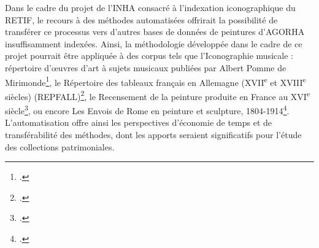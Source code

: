 Dans le cadre du projet de l’INHA consacré à l’indexation iconographique du RETIF, le recours à des méthodes automatisées offrirait la possibilité de transférer ce processus vers d’autres bases de données de peintures d’AGORHA insuffisamment indexées. Ainsi, la méthodologie développée dans le cadre de ce projet pourrait être appliquée à des corpus tels que l’Iconographie musicale : répertoire d'œuvres d'art à sujets musicaux publiées par Albert Pomme de Mirimonde\footcite{institutnationaldhistoiredelartIconographieMusicaleRepertoire}, le Répertoire des tableaux français en Allemagne (XVII\textsuperscript{e} et XVIII\textsuperscript{e} siècles) (REPFALL)\footcite{institutnationaldhistoiredelartRepertoireTableauxFrancais}, le Recensement de la peinture produite en France au XVI\textsuperscript{e} siècle\footcite{institutnationaldhistoiredelartRecensementPeintureProduite}, ou encore Les Envois de Rome en peinture et sculpture, 1804-1914\footcite{institutnationaldhistoiredelartEnvoisRomePeinture}. L’automatisation offre ainsi les perspectives d’économie de temps et de transférabilité des méthodes, dont les apports seraient significatifs pour l’étude des collections patrimoniales.

